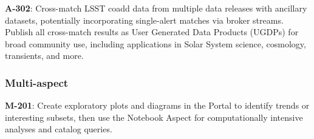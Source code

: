 \textbf{A-302}: Cross-match LSST coadd data from multiple data releases with ancillary datasets, potentially incorporating single-alert matches via broker streams.
Publish all cross-match results as User Generated Data Products (UGDPs) for broad community use, including applications in Solar System science, cosmology, transients, and more.

\subsubsection{Multi-aspect}

\textbf{M-201}: Create exploratory plots and diagrams in the Portal to identify trends or interesting subsets, then use the Notebook Aspect for computationally intensive analyses and catalog queries.
